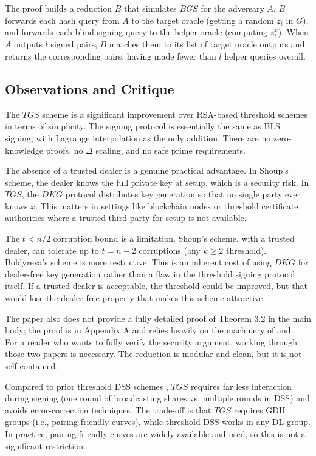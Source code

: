 The proof builds a reduction $B$ that simulates $BGS$ for the adversary $A$. $B$
forwards each hash query from $A$ to the target oracle (getting a random $z_i$ in $G$),
and forwards each blind signing query to the helper oracle (computing $z_i^x$). When $A$
outputs $l$ signed pairs, $B$ matches them to its list of target oracle outputs and
returns the corresponding pairs, having made fewer than $l$ helper queries overall.

\subsection{Observations and Critique}

The $TGS$ scheme is a significant improvement over RSA-based threshold schemes in terms
of simplicity. The signing protocol is essentially the same as BLS signing, with Lagrange
interpolation as the only addition. There are no zero-knowledge proofs, no $\Delta$
scaling, and no safe prime requirements.

The absence of a trusted dealer is a genuine practical advantage. In Shoup's scheme, the
dealer knows the full private key at setup, which is a security risk. In $TGS$, the $DKG$
protocol distributes key generation so that no single party ever knows $x$. This matters
in settings like blockchain nodes or threshold certificate authorities where a trusted
third party for setup is not available.

The $t < n/2$ corruption bound is a limitation. Shoup's scheme, with a trusted dealer,
can tolerate up to $t = n - 2$ corruptions (any $k \geq 2$ threshold). Boldyreva's
scheme is more restrictive. This is an inherent cost of using $DKG$ for dealer-free
key generation rather than a flaw in the threshold signing protocol itself. If a trusted
dealer is acceptable, the threshold could be improved, but that would lose the
dealer-free property that makes this scheme attractive.

The paper also does not provide a fully detailed proof of Theorem 3.2 in the main body;
the proof is in Appendix A and relies heavily on the machinery of \cite{GJKR99} and
\cite{GJKR96}. For a reader who wants to fully verify the security argument, working
through those two papers is necessary. The reduction is modular and clean, but it is not
self-contained.

Compared to prior threshold DSS schemes \cite{GJKR96}, $TGS$ requires far less
interaction during signing (one round of broadcasting shares vs. multiple rounds in DSS)
and avoids error-correction techniques. The trade-off is that $TGS$ requires GDH groups
(i.e., pairing-friendly curves), while threshold DSS works in any DL group. In practice,
pairing-friendly curves are widely available and used, so this is not a significant
restriction.
